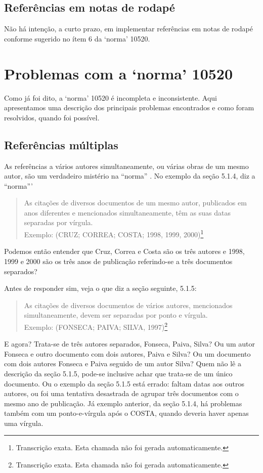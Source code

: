 \documentclass[a4paper]{ltxdoc}
\begin{document}
\subsection{Referências em notas de rodapé}

Não há intenção, a curto prazo, em implementar referências em notas de rodapé
conforme sugerido no ítem 6 da `norma' 10520.

\section{Problemas com a `norma' 10520}

Como já foi dito, a `norma' 10520 \cite{NBR10520:2001} é incompleta e
inconsistente. Aqui apresentamos uma descrição dos principais problemas
encontrados e como foram resolvidos, quando foi possível.

\subsection{Referências múltiplas}

As referências a vários autores simultaneamente, ou várias obras de um mesmo
autor, são um verdadeiro mistério na ``norma'' \cite{NBR10520:2001}. No exemplo
da seção 5.1.4, diz a ``norma'''

\begin{quote}
As citações de diversos documentos de um mesmo autor, publicados em anos diferentes
e mencionados simultaneamente, têm as suas datas separadas por vírgula.\\
Exemplo: (CRUZ; CORREA; COSTA; 1998, 1999, 2000)\footnote{Transcrição exata. Esta
chamada não foi gerada automaticamente.}
\end{quote}

Podemos então entender que Cruz, Correa e Costa são os três autores e 1998, 1999
e 2000 são os três anos de publicação referindo-se a três documentos separados?

Antes de responder sim, veja o que diz a seção seguinte, 5.1.5:

\begin{quote}
As citações de diversos documentos de vários autores, mencionados simultaneamente,
devem ser separadas por ponto e vírgula.\\
Exemplo: (FONSECA; PAIVA; SILVA, 1997)\footnote{Transcrição exata. Esta
chamada não foi gerada automaticamente.}
\end{quote}

E agora? Trata-se de três autores separados, Fonseca, Paiva, Silva? Ou um
autor Fonseca e outro documento com dois autores, Paiva e Silva? Ou um
documento com dois autores Fonseca e Paiva seguido de um autor Silva?
Quem não lê a descrição da seção 5.1.5, pode-se inclusive achar que trata-se
de um único documento. Ou o exemplo da seção 5.1.5 está errado: faltam datas aos
outros autores, ou foi uma tentativa desastrada de agrupar três documentos com
o mesmo ano de publicação. Já exemplo anterior, da seção 5.1.4, há problemas
também com um ponto-e-vírgula após o COSTA, quando deveria haver apenas uma
vírgula. 
\end{document}
